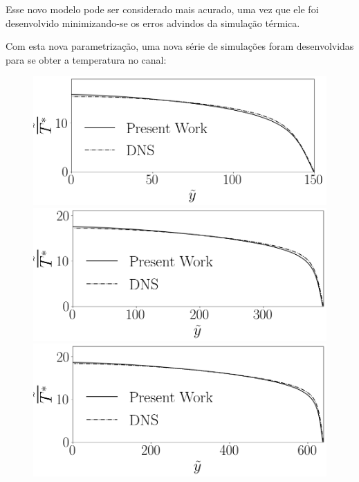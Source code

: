 \vspace{0.5cm}

Esse novo modelo pode ser considerado mais acurado, uma vez que ele foi desenvolvido minimizando-se os erros advindos da simulação térmica.

Com esta nova parametrização, uma nova série de simulações foram desenvolvidas para se obter a temperatura no canal:
   
\begin{figure}[!h]
	\centering
	\begin{minipage}[t]{0.5\textwidth}
		\centering
		\includegraphics[angle=0, scale=0.34]{fotos_formatacao_final/Temperature_150_071_Prt(Ret)_Avelocity}
	\end{minipage}
	\begin{minipage}[t]{0.45\textwidth}
		\centering
		\includegraphics[angle=0, scale=0.34]{fotos_formatacao_final/Temperature_395_071_Prt(Ret)_Avelocity}
	\end{minipage}
	\begin{minipage}[t]{0.5\textwidth}
		\centering
		\includegraphics[angle=0, scale=0.34]{fotos_formatacao_final/Temperature_640_071_Prt(Ret)_Avelocity}

\end{minipage}
\end{figure}
